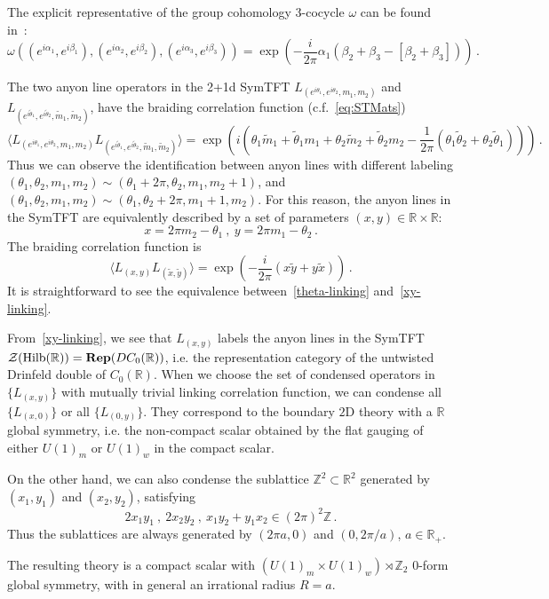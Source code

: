 \documentclass[a4paper,11pt]{article}
\newcommand{\Rep}{\textbf{Rep}}
\newcommand{\be}{\begin{equation}}
\newcommand{\ee}{\end{equation}}
\def\mb{\mathbb}
\def\bbR{\mathbb{R}}
\def\CZ{\mathcal{Z}}
\def\hilb{{\rm Hilb}}
\begin{document}
The explicit representative of the group cohomology 3-cocycle $\omega$ can be found in~\cite{Jia:2025uun}:
\be
\omega((e^{i\alpha_1},e^{i\beta_1}),(e^{i\alpha_2},e^{i\beta_2}),(e^{i\alpha_3},e^{i\beta_3}))=\exp\left(-\frac{i}{2\pi}\alpha_1(\beta_2+\beta_3-[\beta_2+\beta_3])\right)\,.
\ee

The two anyon line operators in the 2+1d SymTFT $L_{(e^{i\theta_1},e^{i\theta_2},m_1,m_2)}$ and $L_{(e^{i\tilde{\theta}_1},e^{i\tilde{\theta}_2},\tilde{m}_1,\tilde{m}_2)}$, have the braiding correlation function (c.f.~\eqref{eq:STMats})
\be
\label{theta-linking}
\langle L_{(e^{i\theta_1},e^{i\theta_2},m_1,m_2)}L_{(e^{i\tilde{\theta}_1},e^{i\tilde{\theta}_2},\tilde{m}_1,\tilde{m}_2)}\rangle=\exp\left(i(\theta_1\tilde{m}_1+\tilde{\theta}_1 m_1+\theta_2\tilde{m}_2+\tilde{\theta}_2 m_2-\frac{1}{2\pi}(\theta_1\tilde{\theta}_2+\theta_2\tilde{\theta}_1))\right)\,.
\ee
Thus we can observe the identification between anyon lines with different labeling $(\theta_1,\theta_2,m_1,m_2)\sim (\theta_1+2\pi,\theta_2,m_1,m_2+1)$, and $(\theta_1,\theta_2,m_1,m_2)\sim (\theta_1,\theta_2+2\pi,m_1+1,m_2)$. For this reason, the anyon lines in the SymTFT are equivalently described by a set of parameters $(x,y)\in\mb{R}\times\mb{R}$:
\be
x=2\pi m_2-\theta_1\ ,\ y=2\pi m_1-\theta_2\,.
\ee
The braiding correlation function is
\be
\label{xy-linking}
\langle L_{(x,y)}L_{(\tilde{x},\tilde{y})}\rangle=\exp\left(-\frac{i}{2\pi}(x\tilde{y}+y\tilde{x})\right)\,.
\ee
It is straightforward to see the equivalence between~\eqref{theta-linking} and~\eqref{xy-linking}.

From~\eqref{xy-linking}, we see that $L_{(x,y)}$ labels the anyon lines in the SymTFT $\CZ(\hilb(\bbR))=\Rep(DC_0(\mb{R}))$, i.e. the representation category of the untwisted Drinfeld double of $C_0(\mb{R})$. When we choose the set of condensed operators in $\{L_{(x,y)}\}$ with mutually trivial linking correlation function, we can condense all $\{L_{(x,0)}\}$ or all $\{L_{(0,y)}\}$. They correspond to the boundary $2$D theory with a $\mb{R}$ global symmetry, i.e. the non-compact scalar obtained by the flat gauging of either $U(1)_m$ or $U(1)_w$ in the compact scalar.

On the other hand, we can also condense the sublattice $\mb{Z}^2\subset \mb{R}^2$ generated by $(x_1,y_1)$ and $(x_2,y_2)$, satisfying
\be
2x_1 y_1\ ,\ 2x_2 y_2\ ,\ x_1 y_2+y_1 x_2\in (2\pi)^2\mb{Z}\,.
\ee
Thus the sublattices are always generated by $(2\pi a,0)$ and $(0,2\pi/a)$, $a\in\mb{R}_+$.

The resulting theory is a compact scalar with $(U(1)_m\times U(1)_w)\rtimes \mb{Z}_2$ 0-form global symmetry, with in general an irrational radius $R=a$. 
\end{document}

